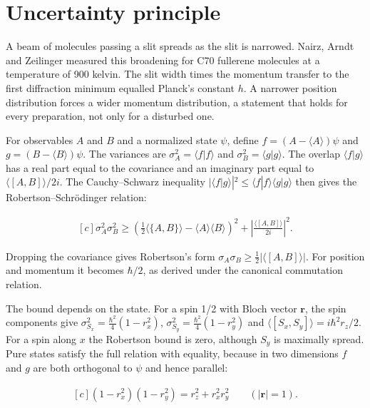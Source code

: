 \documentclass[11pt,oneside]{book}
\newenvironment{centeredalign}{\[\begin{gathered}[c]}{\end{gathered}\]}
\begin{document}
\clearpage

\section{Uncertainty principle}

\label{topic:uncertainty-principle}

A beam of molecules passing a slit spreads as the slit is narrowed. Nairz, Arndt and Zeilinger measured this broadening for C70 fullerene molecules at a temperature of 900 kelvin. The slit width times the momentum transfer to the first diffraction minimum equalled Planck's constant \(h\). A narrower position distribution forces a wider momentum distribution, a statement that holds for every preparation, not only for a disturbed one.

For observables \(A\) and \(B\) and a normalized state \(\psi\), define \(f=(A-\langle A\rangle)\psi\) and \(g=(B-\langle B\rangle)\psi\). The variances are \(\sigma_A^2=\langle f|f\rangle\) and \(\sigma_B^2=\langle g|g\rangle\). The overlap \(\langle f|g\rangle\) has a real part equal to the covariance and an imaginary part equal to \(\langle[A,B]\rangle/2i\). The Cauchy--Schwarz inequality \(|\langle f|g\rangle|^2\leq\langle f|f\rangle\langle g|g\rangle\) then gives the Robertson--Schrödinger relation:

\begin{centeredalign}
\sigma_A^2\sigma_B^2\geq
\left(\tfrac12\langle\{A,B\}\rangle-\langle A\rangle\langle B\rangle\right)^2
+\left|\frac{\langle[A,B]\rangle}{2i}\right|^2.
\end{centeredalign}

Dropping the covariance gives Robertson's form \(\sigma_A\sigma_B\geq\tfrac12|\langle[A,B]\rangle|\). For position and momentum it becomes \(\hbar/2\), as derived under the canonical commutation relation.

The bound depends on the state. For a spin 1/2 with Bloch vector \(\mathbf r\), the spin components give \(\sigma_{S_x}^2=\tfrac{\hbar^2}{4}(1-r_x^2)\), \(\sigma_{S_y}^2=\tfrac{\hbar^2}{4}(1-r_y^2)\) and \(\langle[S_x,S_y]\rangle=i\hbar^2r_z/2\). For a spin along \(x\) the Robertson bound is zero, although \(S_y\) is maximally spread. Pure states satisfy the full relation with equality, because in two dimensions \(f\) and \(g\) are both orthogonal to \(\psi\) and hence parallel:

\begin{centeredalign}
(1-r_x^2)(1-r_y^2)=r_z^2+r_x^2r_y^2\qquad (|\mathbf r|=1).
\end{centeredalign}
\end{document}
